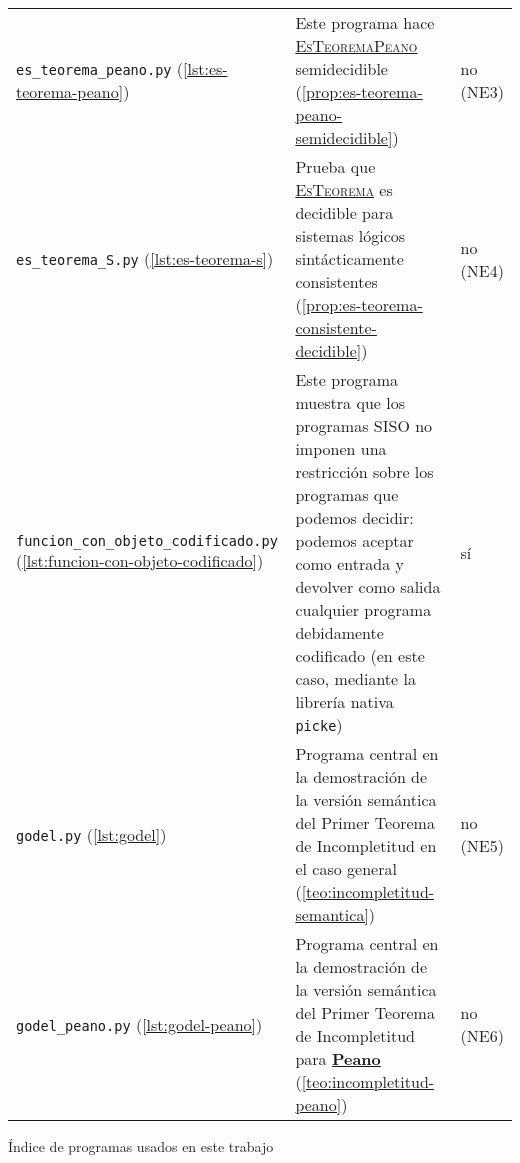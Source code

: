 \begin{tabularx}{\textwidth}{L{0.3} L{0.5} L{0.2}}
\texttt{es\_teorema\_peano.py} \linebreak \small{(\cref{lst:es-teorema-peano})} & Este programa hace \hyperref[prob:es-teorema-peano]{\textsc{EsTeoremaPeano}} semidecidible (\cref{prop:es-teorema-peano-semidecidible}) \vspace{4pt} & no (NE3) \\

\texttt{es\_teorema\_S.py} \linebreak \small{(\cref{lst:es-teorema-s})} & Prueba que \hyperref[prob:es-teorema]{\textsc{EsTeorema}} es decidible para sistemas lógicos sintácticamente consistentes (\cref{prop:es-teorema-consistente-decidible}) \vspace{4pt} & no (NE4) \\

\texttt{funcion\_con\_objeto}\linebreak\texttt{\_codificado.py} \linebreak \small{(\cref{lst:funcion-con-objeto-codificado})} & Este programa muestra que los programas SISO no imponen una restricción sobre los programas que podemos decidir: podemos aceptar como entrada y devolver como salida cualquier programa debidamente codificado (en este caso, mediante la librería nativa \texttt{picke}) \vspace{4pt} & sí \\

\texttt{godel.py} \linebreak \small{(\cref{lst:godel})} & Programa central en la demostración de la versión semántica del Primer Teorema de Incompletitud en el caso general (\cref{teo:incompletitud-semantica}) \vspace{4pt} & no (NE5) \\

\texttt{godel\_peano.py} \linebreak \small{(\cref{lst:godel-peano})} & Programa central en la demostración de la versión semántica del Primer Teorema de Incompletitud para \hyperref[sl:peano]{\textbf{Peano}} (\cref{teo:incompletitud-peano}) \vspace{2pt} & no (NE6) \\

\midrule
\end{tabularx}
\vspace*{-0.2cm}
\begin{tabla}
\caption{Índice de programas usados en este trabajo}
\label{tab:indice-programas}
\end{tabla}
\vspace*{-1cm}

